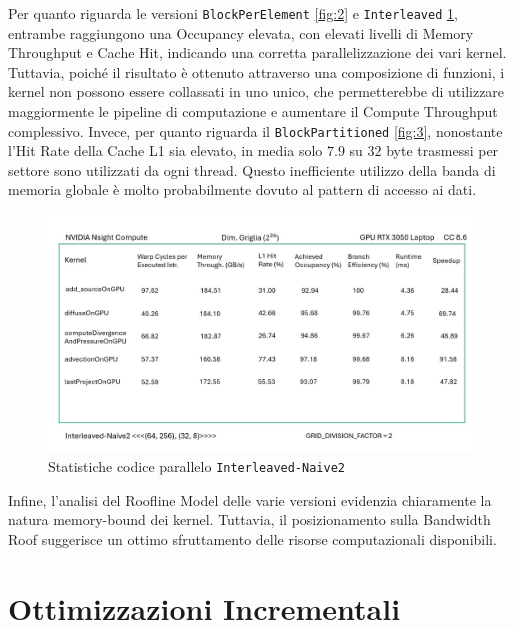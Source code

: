\documentclass[12pt,a4paper,openany,twoside]{article}
\begin{document}
Per quanto riguarda le versioni \texttt{BlockPerElement} \ref{fig:2} e \texttt{Interleaved} \ref{fig:5}, entrambe raggiungono una Occupancy elevata, con elevati livelli di Memory Throughput e Cache Hit, indicando una corretta parallelizzazione dei vari kernel. Tuttavia, poiché il risultato è ottenuto attraverso una composizione di funzioni, i kernel non possono essere collassati in uno unico, che permetterebbe di utilizzare maggiormente le pipeline di computazione e aumentare il Compute Throughput complessivo. Invece, per quanto riguarda il \texttt{BlockPartitioned} \ref{fig:3}, nonostante l'Hit Rate della Cache L1 sia elevato, in media solo \(7.9\) su \(32\) byte trasmessi per settore sono utilizzati da ogni thread. Questo inefficiente utilizzo della banda di memoria globale è molto probabilmente dovuto al pattern di accesso ai dati.

\begin{figure}
    \centering
    \includegraphics[width=0.75\linewidth]{figures/Slide5.jpg}
    \caption{Statistiche codice parallelo \texttt{Interleaved-Naive2}}
    \label{fig:5}
\end{figure}

Infine, l'analisi del Roofline Model delle varie versioni evidenzia chiaramente la natura memory-bound dei kernel. Tuttavia, il posizionamento sulla Bandwidth Roof suggerisce un ottimo sfruttamento delle risorse computazionali disponibili.




\section{Ottimizzazioni Incrementali}
\end{document}

